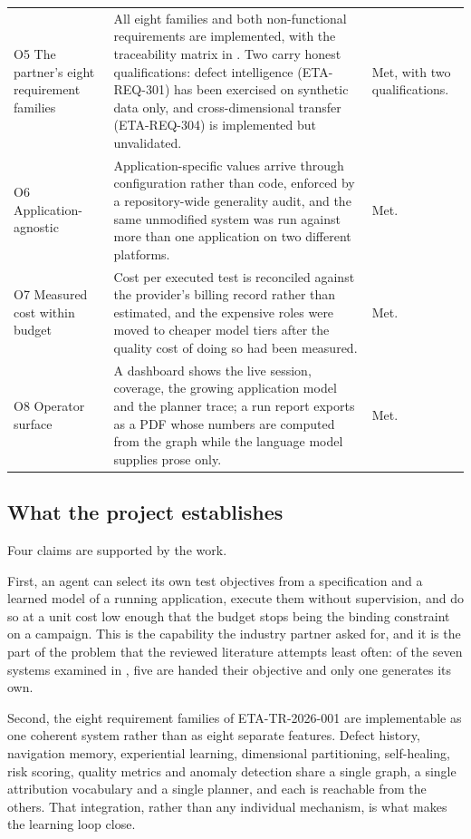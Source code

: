 \begin{xltabular}{\textwidth}{@{}>{\hsize}Y>{\hsize}Y>{\hsize}Y@{}}
  \addlinespace
  O5 The partner's eight requirement families &
    All eight families and both non-functional requirements are implemented, with the traceability matrix in . Two carry honest qualifications: defect intelligence (ETA-REQ-301) has been exercised on synthetic data only, and cross-dimensional transfer (ETA-REQ-304) is implemented but unvalidated. &
    Met, with two qualifications. \\
  \addlinespace
  O6 Application-agnostic &
    Application-specific values arrive through configuration rather than code, enforced by a repository-wide generality audit, and the same unmodified system was run against more than one application on two different platforms. &
    Met. \\
  \addlinespace
  O7 Measured cost within budget &
    Cost per executed test is reconciled against the provider's billing record rather than estimated, and the expensive roles were moved to cheaper model tiers after the quality cost of doing so had been measured. &
    Met.  \\
  \addlinespace
  O8 Operator surface &
    A dashboard shows the live session, coverage, the growing application model and the planner trace; a run report exports as a PDF whose numbers are computed from the graph while the language model supplies prose only. &
    Met. \\
\end{xltabular}
\endgroup

\subsection*{What the project establishes}

Four claims are supported by the work.

First, an agent can select its own test objectives from a specification and a
learned model of a running application, execute them without supervision, and
do so at a unit cost low enough that the budget stops being the binding
constraint on a campaign. This is the capability the industry partner asked for,
and it is the part of the problem that the reviewed literature attempts least
often: of the seven systems examined in , five are handed
their objective and only one generates its own.

Second, the eight requirement families of ETA-TR-2026-001 are implementable as
one coherent system rather than as eight separate features. Defect history,
navigation memory, experiential learning, dimensional partitioning, self-healing,
risk scoring, quality metrics and anomaly detection share a single graph, a
single attribution vocabulary and a single planner, and each is reachable from
the others. That integration, rather than any individual mechanism, is what
makes the learning loop close.

